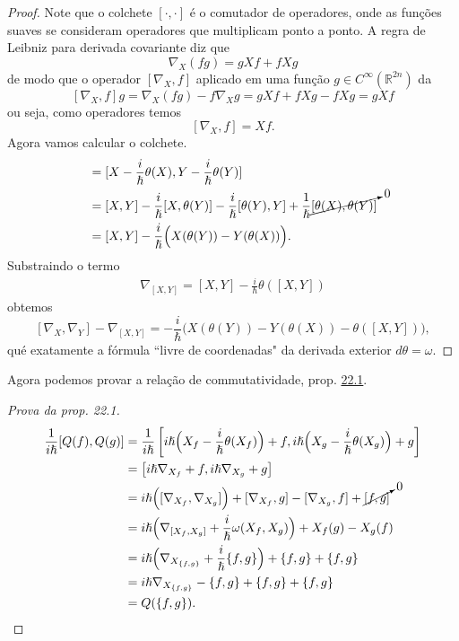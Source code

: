 \begin{proof}\leavevmode
	Note que o colchete $[\cdot,\cdot]$ é o comutador de operadores, onde as funções suaves se consideram operadores que multiplicam ponto a ponto. A regra de Leibniz para derivada covariante diz que
	\[\nabla_X(fg)=gXf+fXg\]
	de modo que o operador $[\nabla_X,f]$ aplicado em uma função $g\in C^\infty(\mathbb{R}^{2n})$ da
\[[\nabla_X,f]g=\nabla_X(fg)-f \nabla_Xg=gXf+fXg-fXg=gXf\]
ou seja, como operadores temos
\[[\nabla_X,f]=Xf.\]
Agora vamos calcular o colchete.
\begin{align*}
	[\nabla_X,\nabla_Y]&=[X-\frac{i}{\hslash}\theta(X),Y-\frac{i}{\hslash}\theta(Y)]\\
			   &=[X,Y]-\frac{i}{\hslash}[X,\theta(Y)]-\frac{i}{\hslash}[\theta(Y),Y]+\frac{1}{\hslash}\cancelto{0}{[\theta(X),\theta(Y)]}\\
			   &=[X,Y]-\frac{i}{\hslash}\Big(X(\theta(Y))-Y(\theta(X))\Big).
\end{align*}
Substraindo o termo
\begin{align*}
	\nabla_{[X,Y]}=[X,Y]-\frac{i}{\hslash}\theta([X,Y])
\end{align*}
obtemos
\[[\nabla_X,\nabla_Y]-\nabla_{[X,Y]}=-\frac{i}{\hslash}\Big(X(\theta(Y))-Y(\theta(X))-\theta([X,Y])\Big),\]
qué exatamente a fórmula ``livre de coordenadas" da derivada exterior $d\theta=\omega$.
\end{proof}

Agora podemos provar a relação de commutatividade, prop. \hyperref[prop:22.1]{22.1}.

\begin{proof}[Prova da prop. 22.1]\leavevmode
\begin{align*}
	\frac{1}{i\hslash}[Q(f),Q(g)]&=\frac{1}{i\hslash}\left[  i\hslash \Big(X_f-\frac{i}{\hslash}\theta(X_f)\Big)+f,i\hslash \Big(X_g-\frac{i}{\hslash}\theta(X_g)\Big)+g\right]\\
&=\left[i\hslash \nabla_{X_f}+f,i\hslash\nabla_{X_g}+g \right] \\
&=i\hslash\Big([\nabla_{X_f},\nabla_{X_g}]\Big)+[\nabla_{X_f},g]-[\nabla_{X_g},f]+\cancelto{0}{[f,g]}\\
&=i\hslash\Big(\nabla_{[X_f,X_g]}+\frac{i}{\hslash}\omega(X_f,X_g)\Big)+X_f(g)-X_g(f)\\
&=i\hslash\Big(\nabla_{X_{\{f,g\}}}+\frac{i}{\hslash}\{f,g\}\Big)+\{f,g\}+\{f,g\}\\
&=i\hslash \nabla_{X_{\{f,g\}}}-\{f,g\}+\{f,g\}+\{f,g\}\\
&=Q(\{f,g\}).
\end{align*}
\end{proof}

